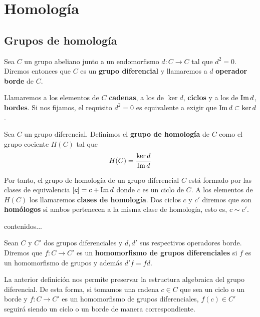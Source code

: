 
\chapter{Homología}

\section{Grupos de homología}

\begin{definicion}
	Sea $C$ un grupo abeliano junto a un endomorfismo  $d: C \rightarrow C$ tal que $d^2 = 0$. Diremos entonces que $C$ es un \textbf{grupo diferencial} y llamaremos a $d$ \textbf{operador borde} de $C$.
\end{definicion}

Llamaremos a los elementos de $C$ \textbf{cadenas}, a los de $\ker d$, \textbf{ciclos} y a los de $\operatorname{Im} d$, \textbf{bordes}. Si nos fijamos, el requisito $d^2 = 0$ es equivalente a exigir que $\operatorname{Im}{d} \subset \ker{d}$.

\begin{definicion}
	Sea $C$ un grupo diferencial. Definimos el \textbf{grupo de homología} de $C$ como el grupo cociente $H(C)$ tal que 
	\[ H(C) = \frac{\ker d}{\operatorname{Im} d}\]
\end{definicion}

Por tanto, el grupo de homología de un grupo diferencial $C$ está formado por las clases de equivalencia $[c] = c + \operatorname{Im} d$ donde $c$ es un ciclo de $C$. A los elementos de $H(C)$ los llamaremos \textbf{clases de homología}. Dos ciclos $c$ y $c'$ diremos que son \textbf{homólogos} si ambos pertenecen a la misma clase de homología, esto es, $c \sim c'$.

\begin{ejemplo}
	contenidos...
\end{ejemplo}

\begin{definicion}
	Sean $C$ y $C'$ dos grupos diferenciales y $d, d'$ sus respectivos operadores borde. Diremos que $f: C \rightarrow C'$ es un \textbf{homomorfismo de grupos diferenciales} si $f$ es un homomorfismo de grupos y además $d'f = fd$.
\end{definicion}

La anterior definición nos permite preservar la estructura algebraica del grupo diferencial. De esta forma, si tomamos una cadena $c \in C$ que sea un ciclo o un borde y $f:C \rightarrow C'$ es un homomorfismo de grupos diferenciales, $f(c) \in C'$ seguirá siendo un ciclo o un borde de manera correspondiente.


